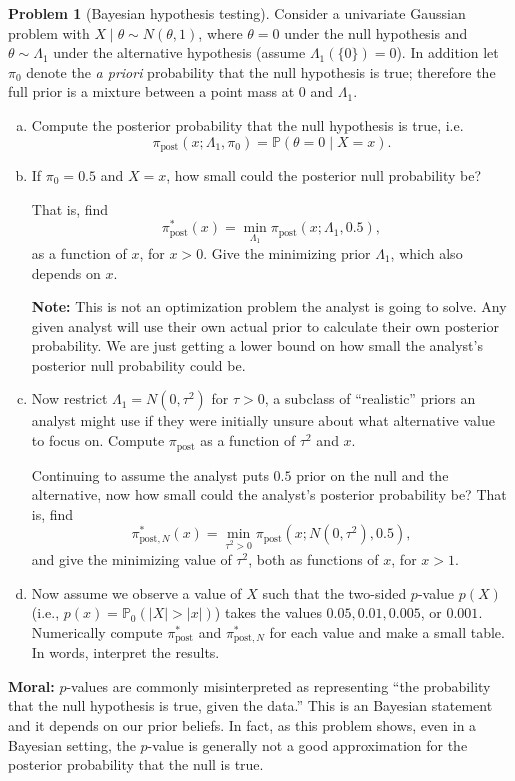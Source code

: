\documentclass{article}
\newcommand{\PP}{\mathbb{P}}
\theoremstyle{definition}
\newtheorem{problem}{Problem}
\begin{document}
\begin{problem}[Bayesian hypothesis testing]
Consider a univariate Gaussian problem with $X\mid \theta \sim N(\theta, 1)$, where $\theta=0$ under the null hypothesis and $\theta\sim \Lambda_1$ under the alternative hypothesis (assume $\Lambda_1(\{0\})=0$). In addition let $\pi_0$ denote the {\em a priori} probability that the null hypothesis is true; therefore the full prior is a mixture between a point mass at 0 and $\Lambda_1$.

\begin{enumerate}[(a)]
\item Compute the posterior probability that the null hypothesis is true, i.e.
\[
\pi_{\text{post}}(x; \Lambda_1, \pi_0) = \PP(\theta = 0 \mid X=x).
\]



\item If $\pi_0=0.5$ and $X = x$, how small could the posterior null probability be?

That is, find
\[
\pi_{\text{post}}^*(x) = \min_{\Lambda_1} \pi_{\text{post}}(x; \Lambda_1, 0.5),
\]
as a function of $x$, for $x>0$. Give the minimizing prior $\Lambda_1$, which also depends on $x$.



{\bf Note:} This is not an optimization problem the analyst is going to solve. Any given analyst will use their own actual prior to calculate their own posterior probability. We are just getting a lower bound on how small the analyst's posterior null probability could be.

\item Now restrict $\Lambda_1 = N(0,\tau^2)$ for $\tau > 0$, a subclass of ``realistic'' priors an analyst might use if they were initially unsure about what alternative value to focus on. Compute $\pi_{\text{post}}$ as a function of $\tau^2$ and $x$.

Continuing to assume the analyst puts $0.5$ prior on the null and the alternative, now how small could the analyst's posterior probability be? That is, find
\[
\pi_{\text{post},N}^*(x) = \min_{\tau^2>0} \pi_{\text{post}}(x; N(0,\tau^2), 0.5),
\]
and give the minimizing value of $\tau^2$, both as functions of $x$, for $x > 1$.




\item Now assume we observe a value of $X$ such that the two-sided $p$-value $p(X)$ (i.e., $p(x) = \PP_0(|X|>|x|)$) takes the values $0.05, 0.01, 0.005$, or $0.001$. Numerically compute $\pi_{\text{post}}^*$ and $\pi_{\text{post},N}^*$ for each value and make a small table. In words, interpret the results.



\end{enumerate}


{\bf Moral:} $p$-values are commonly misinterpreted as representing ``the probability that the null hypothesis is true, given the data.'' This is an Bayesian statement and it depends on our prior beliefs. In fact, as this problem shows, even in a Bayesian setting, the $p$-value is generally not a good approximation for the posterior probability that the null is true.
\end{problem}



\end{document}
